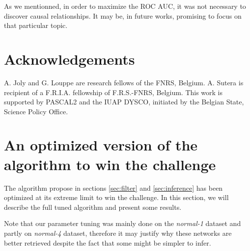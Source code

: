 \documentclass[wcp]{jmlr}
\begin{document}
As we mentionned, in order to maximize the ROC AUC, it was not necessary to
discover causal relationships. It may be, in future works, promising to focus
on that particular topic.


\section*{Acknowledgements}

A. Joly and G. Louppe are research fellows of
the FNRS, Belgium.  A. Sutera is recipient of
a F.R.I.A. fellowship of F.R.S.-FNRS, Belgium.
This work is supported by PASCAL2 and the IUAP DYSCO, initiated by the
Belgian State, Science Policy Office.



\newpage
\clearpage



\newpage
\clearpage

\appendix


\section{An optimized version of the algorithm to win the challenge}
\label{app:optimized}


The algorithm propose in sections \ref{sec:filter} and \ref{sec:inference} has been optimized at its extreme limit to win the challenge. In this section, we will describe the full tuned algorithm and present some results.

Note that our parameter tuning was mainly
done on the \textit{normal-1} dataset and partly on \textit{normal-4} dataset,
therefore it may justify why these networks are better retrieved despite the
fact that some might be simpler to infer.
\end{document}
